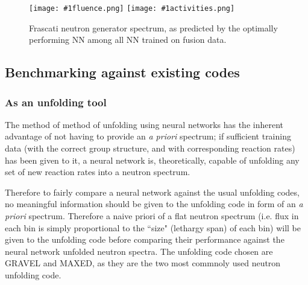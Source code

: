 \documentclass[a4paper, 12pt]{article}
\newcommand{\fluenceandactivities}[1]{
\texttt{[image: \#1fluence.png]}
\texttt{[image: \#1activities.png]}
}
\begin{document}
\begin{figure}[H]
\centering
\fluenceandactivities{/home/ocean/Documents/GitHubDir/unfolding/unfolding/unfoldingsuite/neuralnetwork/realoutputEarlyStopping/SelectedNNreplicated/fusion-fusion/0927_0220_5_layerfinal_inv_5_test_000_}
\caption{Frascati neutron generator spectrum, as predicted by the optimally performing NN among all NN trained on fusion data.}\label{5Layerfusion-fusionFNG}
\end{figure}



\subsection{Benchmarking against existing codes}
\subsubsection{As an unfolding tool}\label{As an unfolding tool}
The method of method of unfolding using neural networks has the inherent advantage of not having to provide an \emph{a priori} spectrum; if sufficient training data (with the correct group structure, and with corresponding reaction rates) has been given to it, a neural network is, theoretically, capable of unfolding any set of new reaction rates into a neutron spectrum. 

Therefore to fairly compare a neural network against the usual unfolding codes, no meaningful information should be given to the unfolding code in form of an \emph{a priori} spectrum. Therefore a naive priori of a flat neutron spectrum (i.e. flux in each bin is simply proportional to the ``size" (lethargy span) of each bin) will be given to the unfolding code before comparing their performance against the neural network unfolded neutron spectra. The unfolding code chosen are GRAVEL and MAXED, as they are the two most commnoly used neutron unfolding code. \cite{LWP_LTIS} \cite{bethColling_TBMD}
\end{document}
